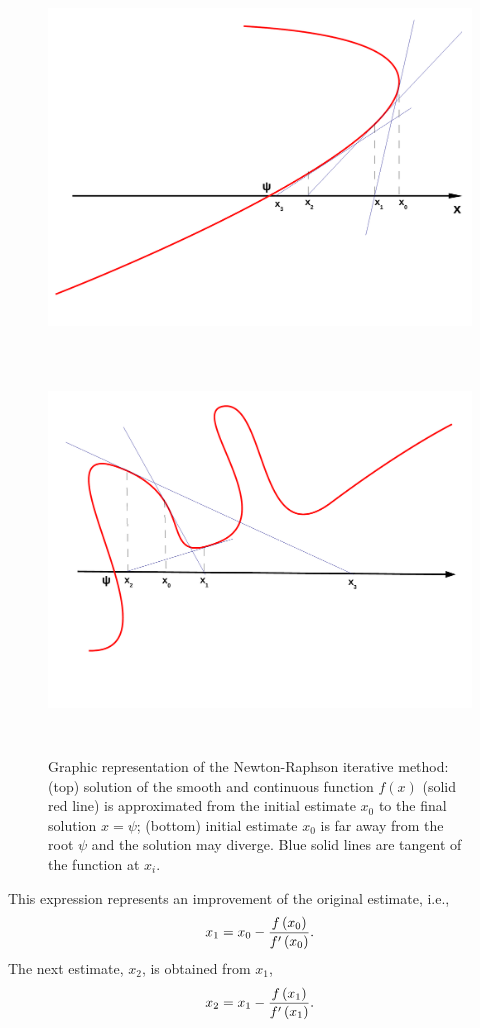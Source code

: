      \begin{figure}[h]\label{Appendix:Fig:NewtonRaphson}%
        \begin{center}
         \vbox{
           \hbox{\includegraphics[width=\columnwidth,height=10cm]{./Pics/NewtonRaphson2}}
           \hbox{\includegraphics[width=\columnwidth,height=10cm]{./Pics/NewtonRaphson3}}}
           \vspace{-1cm}
           \caption{Graphic representation of the Newton-Raphson iterative method: (top) solution of the smooth and continuous function $f(x)$ (solid red line) is approximated from the initial estimate $x_{0}$ to the final solution $x=\psi$; (bottom) initial estimate $x_{0}$ is far away from the root $\psi$ and the solution may diverge. Blue solid lines are tangent of the function at $x_{i}$.} 
        \end{center}
      \end{figure}
%
This expression represents an improvement of the original estimate, i.e.,  
   \begin{displaymath}
        x_{1} = x_{0} -\displaystyle\frac{f\left(x_{0}\right)}{f'\left(x_{0}\right)}.
   \end{displaymath}
The next estimate, $x_{2}$, is obtained from $x_{1}$, 
   \begin{displaymath}
        x_{2} = x_{1} -\displaystyle\frac{f\left(x_{1}\right)}{f'\left(x_{1}\right)}.
   \end{displaymath}

